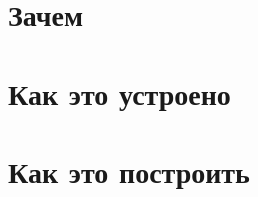 \documentclass[11pt,a4paper,oneside,openany]{book}
\begin{document}
\frontmatter

\tableofcontents
\mainmatter
\part{Зачем}


\part{Как это устроено}







\part{Как это построить}




\appendix

\end{document}
